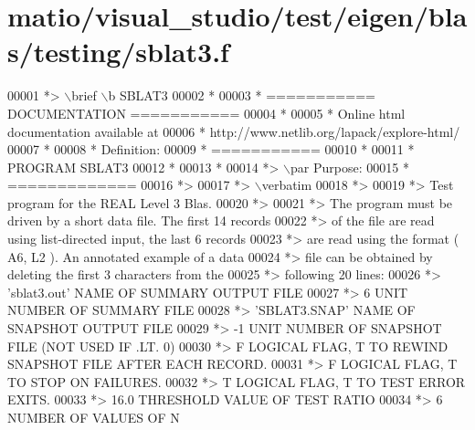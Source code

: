 \hypertarget{matio_2visual__studio_2test_2eigen_2blas_2testing_2sblat3_8f_source}{}\section{matio/visual\+\_\+studio/test/eigen/blas/testing/sblat3.f}
\label{matio_2visual__studio_2test_2eigen_2blas_2testing_2sblat3_8f_source}

\begin{DoxyCode}
00001 \textcolor{comment}{*> \(\backslash\)brief \(\backslash\)b SBLAT3}
00002 \textcolor{comment}{*}
00003 \textcolor{comment}{*  =========== DOCUMENTATION ===========}
00004 \textcolor{comment}{*}
00005 \textcolor{comment}{* Online html documentation available at }
00006 \textcolor{comment}{*            http://www.netlib.org/lapack/explore-html/ }
00007 \textcolor{comment}{*}
00008 \textcolor{comment}{*  Definition:}
00009 \textcolor{comment}{*  ===========}
00010 \textcolor{comment}{*}
00011 \textcolor{comment}{*       PROGRAM SBLAT3}
00012 \textcolor{comment}{* }
00013 \textcolor{comment}{*}
00014 \textcolor{comment}{*> \(\backslash\)par Purpose:}
00015 \textcolor{comment}{*  =============}
00016 \textcolor{comment}{*>}
00017 \textcolor{comment}{*> \(\backslash\)verbatim}
00018 \textcolor{comment}{*>}
00019 \textcolor{comment}{*> Test program for the REAL             Level 3 Blas.}
00020 \textcolor{comment}{*>}
00021 \textcolor{comment}{*> The program must be driven by a short data file. The first 14 records}
00022 \textcolor{comment}{*> of the file are read using list-directed input, the last 6 records}
00023 \textcolor{comment}{*> are read using the format ( A6, L2 ). An annotated example of a data}
00024 \textcolor{comment}{*> file can be obtained by deleting the first 3 characters from the}
00025 \textcolor{comment}{*> following 20 lines:}
00026 \textcolor{comment}{*> 'sblat3.out'      NAME OF SUMMARY OUTPUT FILE}
00027 \textcolor{comment}{*> 6                 UNIT NUMBER OF SUMMARY FILE}
00028 \textcolor{comment}{*> 'SBLAT3.SNAP'     NAME OF SNAPSHOT OUTPUT FILE}
00029 \textcolor{comment}{*> -1                UNIT NUMBER OF SNAPSHOT FILE (NOT USED IF .LT. 0)}
00030 \textcolor{comment}{*> F        LOGICAL FLAG, T TO REWIND SNAPSHOT FILE AFTER EACH RECORD.}
00031 \textcolor{comment}{*> F        LOGICAL FLAG, T TO STOP ON FAILURES.}
00032 \textcolor{comment}{*> T        LOGICAL FLAG, T TO TEST ERROR EXITS.}
00033 \textcolor{comment}{*> 16.0     THRESHOLD VALUE OF TEST RATIO}
00034 \textcolor{comment}{*> 6                 NUMBER OF VALUES OF N}

\end{DoxyCode}
